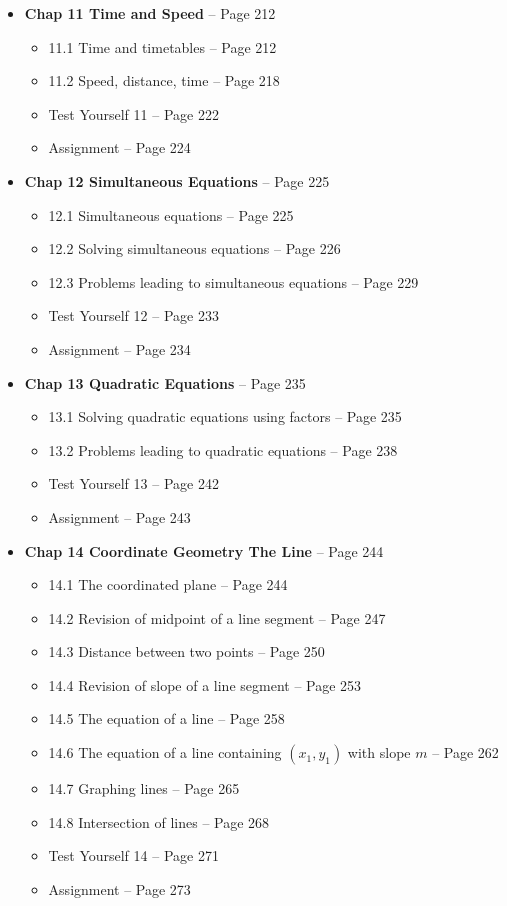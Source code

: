 \documentclass{article}
\begin{document}
\begin{itemize}
    \item \textbf{Chap 11 Time and Speed} -- Page 212
    \begin{itemize}
        \item 11.1 Time and timetables -- Page 212
        \item 11.2 Speed, distance, time -- Page 218
        \item Test Yourself 11 -- Page 222
        \item Assignment -- Page 224
    \end{itemize}

    \item \textbf{Chap 12 Simultaneous Equations} -- Page 225
    \begin{itemize}
        \item 12.1 Simultaneous equations -- Page 225
        \item 12.2 Solving simultaneous equations -- Page 226
        \item 12.3 Problems leading to simultaneous equations -- Page 229
        \item Test Yourself 12 -- Page 233
        \item Assignment -- Page 234
    \end{itemize}

    \item \textbf{Chap 13 Quadratic Equations} -- Page 235
    \begin{itemize}
        \item 13.1 Solving quadratic equations using factors -- Page 235
        \item 13.2 Problems leading to quadratic equations -- Page 238
        \item Test Yourself 13 -- Page 242
        \item Assignment -- Page 243
    \end{itemize}

    \item \textbf{Chap 14 Coordinate Geometry The Line} -- Page 244
    \begin{itemize}
        \item 14.1 The coordinated plane -- Page 244
        \item 14.2 Revision of midpoint of a line segment -- Page 247
        \item 14.3 Distance between two points -- Page 250
        \item 14.4 Revision of slope of a line segment -- Page 253
        \item 14.5 The equation of a line -- Page 258
        \item 14.6 The equation of a line containing $(x_1, y_1)$ with slope $m$ -- Page 262
        \item 14.7 Graphing lines -- Page 265
        \item 14.8 Intersection of lines -- Page 268
        \item Test Yourself 14 -- Page 271
        \item Assignment -- Page 273
    \end{itemize}


\end{itemize}
\end{document}
